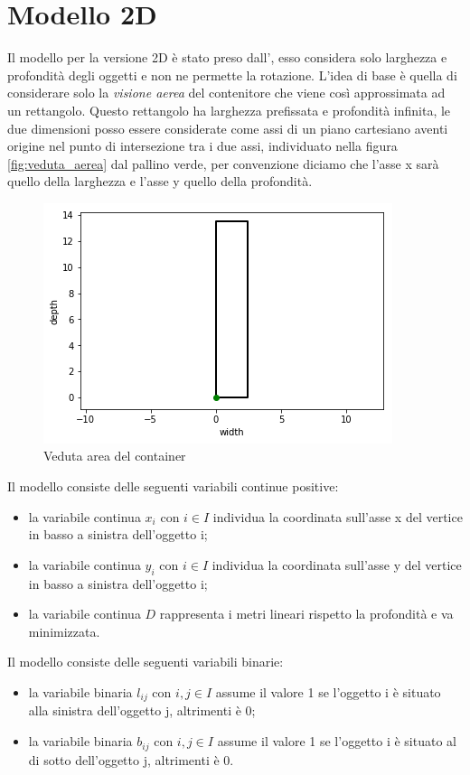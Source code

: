 \section{Modello 2D}
Il modello per la versione 2D è stato preso dall', esso considera solo larghezza e profondità degli oggetti e non ne permette la rotazione. L'idea di base è quella di considerare solo la \textit{visione aerea} del contenitore che viene così approssimata ad un rettangolo. Questo rettangolo ha larghezza prefissata e profondità infinita, le due dimensioni posso essere considerate come assi di un piano cartesiano aventi origine nel punto di intersezione tra i due assi, individuato nella figura \eqref{fig:veduta_aerea} dal pallino verde, per convenzione diciamo che l'asse x sarà quello della larghezza e l'asse y quello della profondità.
\begin{figure}[H]
	\begin{center} \includegraphics[scale=0.6]{figures/cartesian_wd}
		\caption[Veduta area - piano cartesiano]{Veduta area del container}  
		\label{fig:veduta_aerea}
	\end{center}
\end{figure}

\noindent Il modello consiste delle seguenti variabili continue positive:
\begin{itemize}
	\item la variabile continua $x_{i}$ con $i \in I$ individua la coordinata sull'asse x del vertice in basso a sinistra dell'oggetto i;
	\item la variabile continua $y_{i}$ con $i \in I$ individua la coordinata sull'asse y del vertice in basso a sinistra dell'oggetto i;
	\item la variabile continua $D$ rappresenta i metri lineari rispetto la profondità e va minimizzata.
\end{itemize}
Il modello consiste delle seguenti variabili binarie:
\begin{itemize}
	\item la variabile binaria $l_{ij}$ con $i,j \in I$ assume il valore 1 se l'oggetto i è situato alla sinistra dell'oggetto j, altrimenti è 0;
	\item la variabile binaria $b_{ij}$ con $i,j \in I$ assume il valore 1 se l'oggetto i è situato al di sotto dell'oggetto j, altrimenti è 0.
\end{itemize}

